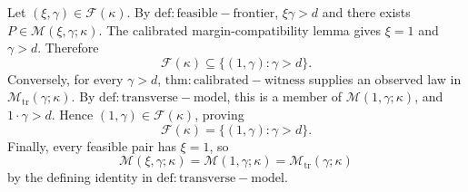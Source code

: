 Let \((\xi,\gamma)\in\mathcal F(\kappa)\). By \(\mathrm{def:feasible-frontier}\), \(\xi\gamma>d\) and there exists \(P\in\mathcal M(\xi,\gamma;\kappa)\). The calibrated margin-compatibility lemma gives \(\xi=1\) and \(\gamma>d\). Therefore
\[
\mathcal F(\kappa)\subseteq\{(1,\gamma):\gamma>d\}.
\]
Conversely, for every \(\gamma>d\), \(\mathrm{thm:calibrated-witness}\) supplies an observed law in \(\mathcal M_{\mathrm{tr}}(\gamma;\kappa)\). By \(\mathrm{def:transverse-model}\), this is a member of \(\mathcal M(1,\gamma;\kappa)\), and \(1\cdot\gamma>d\). Hence \((1,\gamma)\in\mathcal F(\kappa)\), proving
\[
\mathcal F(\kappa)=\{(1,\gamma):\gamma>d\}.
\]
Finally, every feasible pair has \(\xi=1\), so
\[
\mathcal M(\xi,\gamma;\kappa)=\mathcal M(1,\gamma;\kappa)=\mathcal M_{\mathrm{tr}}(\gamma;\kappa)
\]
by the defining identity in \(\mathrm{def:transverse-model}\).